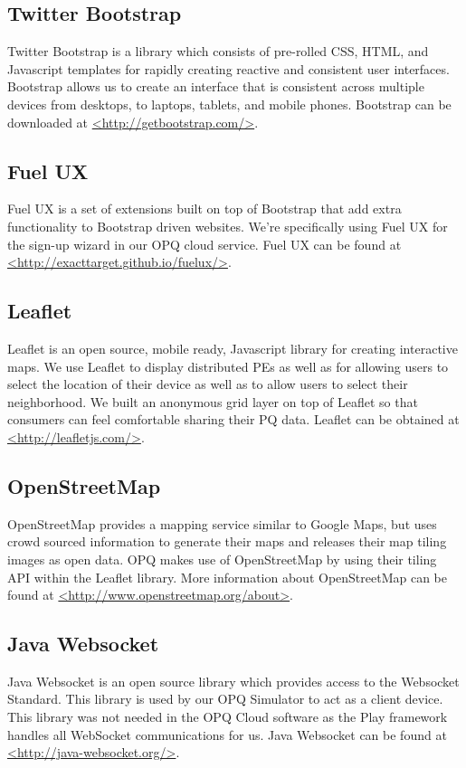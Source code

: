 \subsection{Twitter Bootstrap}
Twitter Bootstrap is a library which consists of pre-rolled CSS, HTML, and Javascript templates for rapidly creating reactive and consistent user interfaces. Bootstrap allows us to create an interface that is consistent across multiple devices from desktops, to laptops, tablets, and mobile phones. Bootstrap can be downloaded at \url{<http://getbootstrap.com/>}.

\subsection{Fuel UX}
Fuel UX is a set of extensions built on top of Bootstrap that add extra functionality to Bootstrap driven websites. We're specifically using Fuel UX for the sign-up wizard in our OPQ cloud service. Fuel UX can be found at \url{<http://exacttarget.github.io/fuelux/>}.

\subsection{Leaflet}
Leaflet is an open source, mobile ready, Javascript library for creating interactive maps. We use Leaflet to display distributed PEs as well as for allowing users to select the location of their device as well as to allow users to select their neighborhood. We built an anonymous grid layer on top of Leaflet so that consumers can feel comfortable sharing their PQ data. Leaflet can be obtained at \url{<http://leafletjs.com/>}.

\subsection{OpenStreetMap}
OpenStreetMap provides a mapping service similar to Google Maps, but uses crowd sourced information to generate their maps and releases their map tiling images as open data. OPQ makes use of OpenStreetMap by using their tiling API within the Leaflet library. More information about OpenStreetMap can be found at \url{<http://www.openstreetmap.org/about>}.

\subsection{Java Websocket}
Java Websocket is an open source library which provides access to the Websocket Standard. This library is used by our OPQ Simulator to act as a client device. This library was not needed in the OPQ Cloud software as the Play framework handles all WebSocket communications for us. Java Websocket can be found at \url{<http://java-websocket.org/>}.

